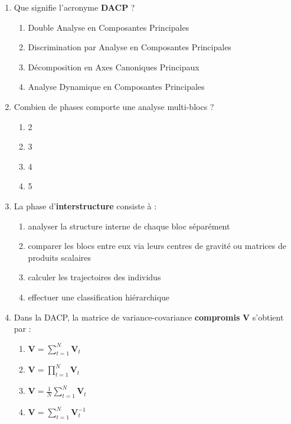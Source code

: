 \documentclass[a4paper,11pt]{article}
\begin{document}
\begin{enumerate}

    \item Que signifie l'acronyme \textbf{DACP} ?
    \begin{enumerate}
        \item Double Analyse en Composantes Principales
        \item Discrimination par Analyse en Composantes Principales
        \item Décomposition en Axes Canoniques Principaux
        \item Analyse Dynamique en Composantes Principales
    \end{enumerate}

    \item Combien de phases comporte une analyse multi-blocs ?
    \begin{enumerate}
        \item 2
        \item 3
        \item 4
        \item 5
    \end{enumerate}

    \item La phase d'\textbf{interstructure} consiste à :
    \begin{enumerate}
        \item analyser la structure interne de chaque bloc séparément
        \item comparer les blocs entre eux via leurs centres de gravité ou matrices de produits scalaires
        \item calculer les trajectoires des individus
        \item effectuer une classification hiérarchique
    \end{enumerate}

    \item Dans la DACP, la matrice de variance-covariance \textbf{compromis} $\mathbf{V}$ s'obtient par :
    \begin{enumerate}
        \item $\mathbf{V} = \sum_{t=1}^N \mathbf{V}_t$
        \item $\mathbf{V} = \prod_{t=1}^N \mathbf{V}_t$
        \item $\mathbf{V} = \frac{1}{N}\sum_{t=1}^N \mathbf{V}_t$
        \item $\mathbf{V} = \sum_{t=1}^N \mathbf{V}_t^{-1}$
    \end{enumerate}


\end{enumerate}
\end{document}
